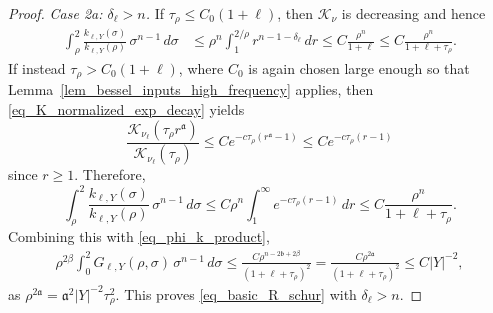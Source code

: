\documentclass[10pt,a4paper]{amsart}
\begin{document}
\begin{proof}
\textit{Case 2a: $\delta_\ell > n$.} If $\tau_\rho\le C_0(1+\ell)$, then $\mathcal K_\nu$ is decreasing and hence
\begin{align}\label{eq_formula3}
\int_\rho^2 \frac{k_{\ell,Y}(\sigma)}{k_{\ell,Y}(\rho)}\,\sigma^{n-1}\,d\sigma
&\le \rho^n
    \int_1^{2/\rho} r^{n-1-\delta_\ell}\,dr
    \le C\frac{\rho^n}{1+\ell}
    \le C\frac{\rho^n}{1+ \ell + \tau_\rho}.
\end{align}
If instead $\tau_\rho>C_0 (1+\ell)$, where $C_0$ is again chosen large enough so that Lemma~\ref{lem_bessel_inputs_high_frequency} applies, then \eqref{eq_K_normalized_exp_decay} yields
\begin{equation*}
    \frac{\mathcal K_{\nu_\ell}(\tau_\rho r^{\mathfrak a})}
         {\mathcal K_{\nu_\ell}(\tau_\rho)}
    \le
    C e^{-c\tau_\rho(r^{\mathfrak a}-1)}
    \le C e^{-c\tau_\rho(r-1)}
\end{equation*}
since $r\ge 1$. Therefore,
\begin{equation}\label{eq_K_ratio_large_ell}
    \int_\rho^2\frac{k_{\ell,Y}(\sigma)}{k_{\ell,Y}(\rho)}\,\sigma^{n-1}\,d\sigma
    \le C\rho^n  \int_1^\infty e^{-c\tau_\rho(r-1)}\,dr
    \le C\frac{\rho^n}{1+\ell+\tau_\rho}.
\end{equation}
Combining this with \eqref{eq_phi_k_product},
\begin{align*}
    \rho^{2\beta}
    \int_0^2
        G_{\ell,Y}(\rho,\sigma)
    \, \sigma^{n-1} \, d\sigma
    \le \frac{C \rho^{n-2 \mathfrak b+2\beta} }{(1+\ell + \tau_\rho)^2}
    = \frac{C \rho^{2 \mathfrak a} }{(1+\ell + \tau_\rho)^2}
    \le C |Y|^{-2},
\end{align*}
as $\rho^{2 \mathfrak a} = \mathfrak a^2 |Y|^{-2} \tau_\rho^2$. This proves \eqref{eq_basic_R_schur} with $\delta_\ell >n$.


\end{proof}
\end{document}
